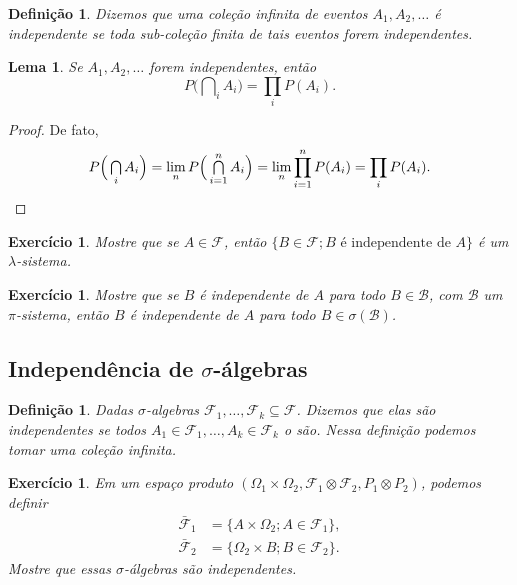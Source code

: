 \documentclass[reqno, draft]{book}
\newcommand*\1{\mathds{1}}
\newtheorem{lemma}[theorem]{Lema}
\newtheorem{definition}[theorem]{Definição}
\newtheorem{exercise}[example]{Exercício}
\DeclareMathOperator*{\mcap}{{\textstyle \bigcap}}
\begin{document}
\begin{definition}
  Dizemos que uma coleção infinita de eventos $A_1, A_2, \dots$ é independente  se toda sub-coleção finita de tais eventos forem independentes.
\end{definition}

\begin{lemma}
  Se $A_1, A_2, \dots$ forem independentes, então
  \begin{equation}
    P\Big( \mcap_{i} A_i \Big) = \prod\limits_{i} P(A_i).
  \end{equation}
\end{lemma}

\begin{proof}
  De fato,
  \begin{equation*}
    P\Big( \mcap_{i} A_i \Big) = \lim_n P\Big( \mcap_{i = 1}^n A_i \Big) = \lim_n \prod\limits_{i=1}^n P(A_i) = \prod\limits_{i} P(A_i). \qedhere
  \end{equation*}
\end{proof}

\begin{exercise}
  Mostre que se $A \in \mathcal{F}$, então $\{B \in \mathcal{F}; B \text{ é independente de } A\}$ é um $\lambda$-sistema.
\end{exercise}

\begin{exercise}
  Mostre que se $B$ é independente de $A$ para todo $B \in \mathcal{B}$, com $\mathcal{B}$ um $\pi$-sistema, então $B$ é independente de $A$ para todo $B \in \sigma(\mathcal{B})$.
\end{exercise}

\subsection{Independência de \texorpdfstring{$\sigma$}{sigma}-álgebras}

\begin{definition}
  Dadas $\sigma$-algebras $\mathcal{F}_1, \dots, \mathcal{F}_k \subseteq \mathcal{F}$.
  Dizemos que elas são independentes  se todos $A_1 \in \mathcal{F}_1, \dots, A_k \in \mathcal{F}_k$ o são.
  Nessa definição podemos tomar uma coleção infinita.
\end{definition}

\begin{exercise}
  Em um espaço produto $(\Omega_1 \times \Omega_2, \mathcal{F}_1 \otimes \mathcal{F}_2, P_1 \otimes P_2)$, podemos definir
  \begin{equation}
    \begin{split}
      \bar{\mathcal{F}}_1 & = \{A \times \Omega_2; A \in \mathcal{F}_1\},\\
      \bar{\mathcal{F}}_2 & = \{\Omega_2 \times B; B \in \mathcal{F}_2\}.
    \end{split}
  \end{equation}
  Mostre que essas $\sigma$-álgebras são independentes.
\end{exercise}
\end{document}
